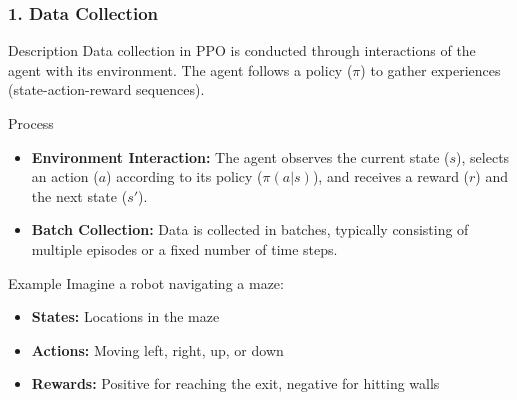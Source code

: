 \documentclass{beamer}
\begin{document}
\begin{frame}[fragile]
    \frametitle{1. Data Collection}
    \begin{block}{Description}
        Data collection in PPO is conducted through interactions of the agent with its environment. The agent follows a policy ($\pi$) to gather experiences (state-action-reward sequences).
    \end{block}
    
    \begin{block}{Process}
        \begin{itemize}
            \item \textbf{Environment Interaction:} 
            The agent observes the current state ($s$), selects an action ($a$) according to its policy ($\pi(a|s)$), and receives a reward ($r$) and the next state ($s'$).
            \item \textbf{Batch Collection:} 
            Data is collected in batches, typically consisting of multiple episodes or a fixed number of time steps.
        \end{itemize}
    \end{block}
    
    \begin{block}{Example}
        Imagine a robot navigating a maze:
        \begin{itemize}
            \item \textbf{States:} Locations in the maze
            \item \textbf{Actions:} Moving left, right, up, or down
            \item \textbf{Rewards:} Positive for reaching the exit, negative for hitting walls
        \end{itemize}
    \end{block}
\end{frame}
\end{document}
